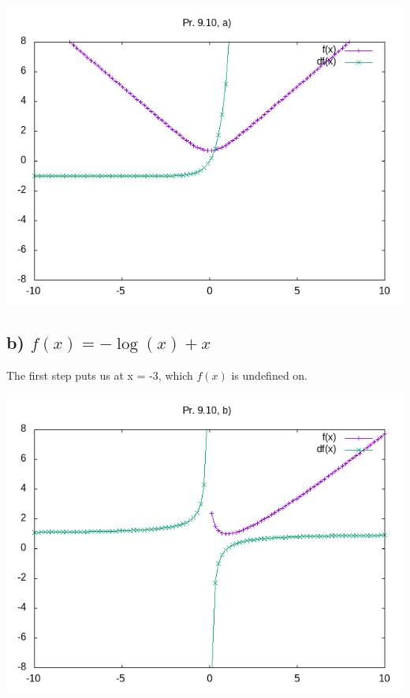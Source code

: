 \documentclass[11pt]{article}
\begin{document}
\begin{center}
\includegraphics[width=.9\linewidth]{f1_1.1.png}
\end{center}

\subsection{b) \(f(x) = -\log(x)+x\)}
\label{sec:org7d159e4}

The first step puts us at x = -3, which \(f(x)\) is undefined on.
\begin{center}
\includegraphics[width=.9\linewidth]{f2.png}
\end{center}
\end{document}
